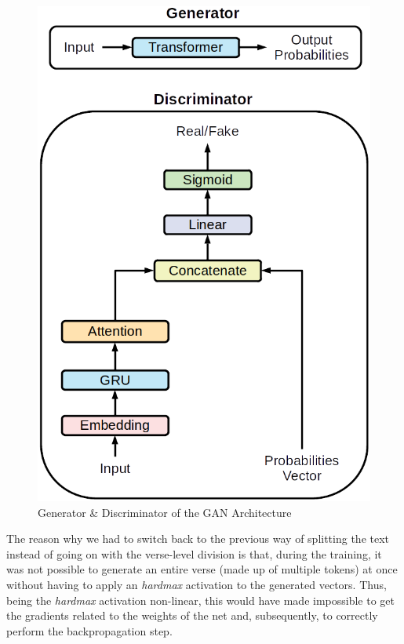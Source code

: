 \begin{figure}[!htb]
    \centering
    \includegraphics[scale=0.6]{images/model-6-specific.png}%
    \caption{Generator \& Discriminator of the GAN Architecture}%
    \label{gan-specific}
\end{figure}

The reason why we had to switch back to the previous way of splitting the text instead of going on with the verse-level division is that, during the training, it was not possible to generate an entire verse (made up of multiple tokens) at once without having to apply an \textit{hardmax} activation to the generated vectors.
Thus, being the \textit{hardmax} activation non-linear, this would have made impossible to get the gradients related to the weights of the net and, subsequently, to correctly perform the backpropagation step.

